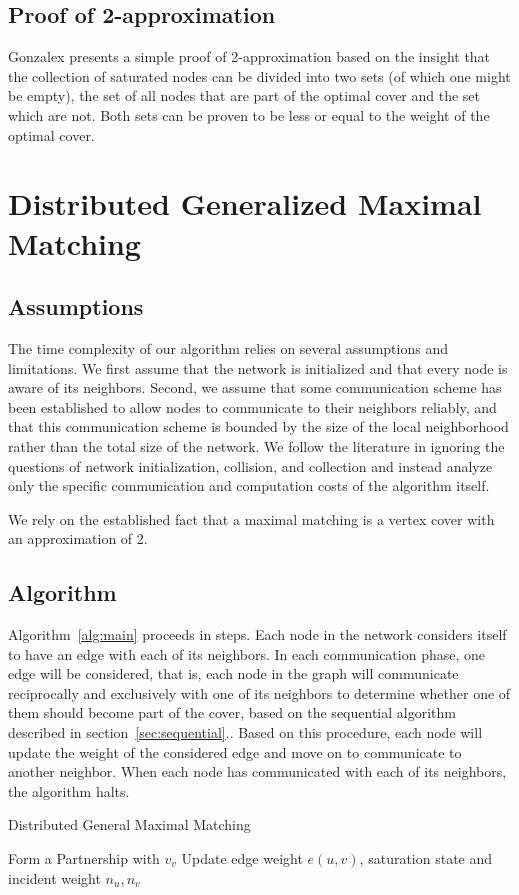 \documentclass[conference, 11pt]{IEEEtran}
\theoremstyle{definition}
\begin{document}
\subsection{Proof of 2-approximation}
Gonzalex presents a simple proof of 2-approximation based on the insight that the collection of saturated nodes can be divided into two sets (of which one might be empty), the set of all nodes that are part of the optimal cover and the set which are not. Both sets can be proven to be less or equal to the weight of the optimal cover.
\section{Distributed Generalized Maximal Matching}
\subsection{Assumptions}
The time complexity of our algorithm relies on several assumptions and limitations. We first assume that the network is initialized and that every node is aware of its neighbors. Second, we assume that some communication scheme has been established to allow nodes to communicate to their neighbors reliably, and that this communication scheme is bounded by the size of the local neighborhood rather than the total size of the network. We follow the literature in ignoring the questions of network initialization, collision, and collection and instead analyze only the specific communication and computation costs of the algorithm itself.

We rely on the established fact that a maximal matching is a vertex cover with an approximation of 2.\cite{1435381}  
\subsection{Algorithm}
Algorithm~\ref{alg:main} proceeds in steps. Each node in the network considers itself to have an edge with each of its neighbors. In each communication phase, one edge will be considered, that is, each node in the graph will communicate reciprocally and exclusively with one of its neighbors to determine whether one of them should become part of the cover, based on the sequential algorithm described in section~\ref{sec:sequential}.. Based on this procedure, each node will update the weight of the considered edge and move on to communicate to another neighbor. When each node has communicated with each of its neighbors, the algorithm halts.
 
\begin{algorithm}
\caption{Distributed General Maximal Matching}
\begin{algorithmic}
\STATE Form a Partnership with $v_v$
\STATE Update edge weight $e(u,v)$, saturation state and incident weight ${n_u, n_v}$
\ENDFOR
\ENDFOR
\end{algorithmic}
\label{alg:main}
\end{algorithm}
\end{document}
